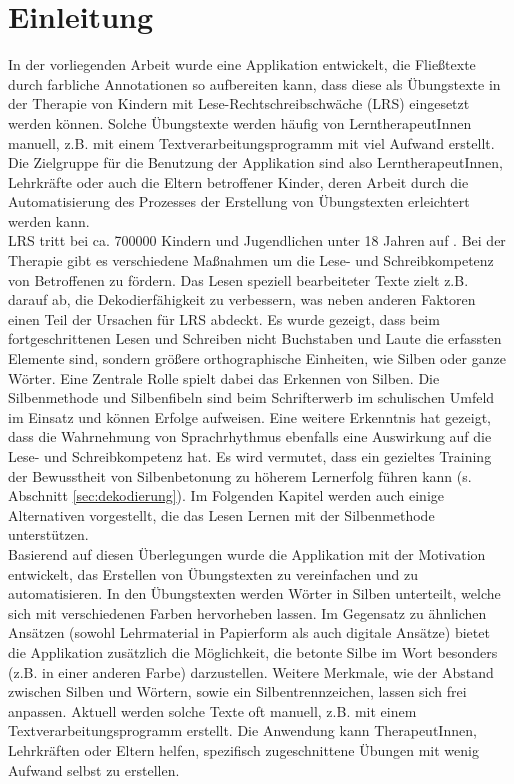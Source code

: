 
\chapter{Einleitung}

In der vorliegenden Arbeit wurde eine Applikation entwickelt, die Fließtexte durch farbliche Annotationen so aufbereiten kann, dass diese als Übungstexte in der Therapie von Kindern mit Lese-Rechtschreibschwäche (LRS) eingesetzt werden können. Solche Übungstexte werden häufig von LerntherapeutInnen manuell, z.B. mit einem Textverarbeitungsprogramm mit viel Aufwand erstellt. Die Zielgruppe für die Benutzung der Applikation sind also LerntherapeutInnen, Lehrkräfte oder auch die Eltern betroffener Kinder, deren Arbeit durch die Automatisierung des Prozesses der Erstellung von Übungstexten erleichtert werden kann.\\

LRS tritt bei ca. 700000 Kindern und Jugendlichen unter 18 Jahren auf \cite{Schulte-Koerne2014} . Bei der Therapie gibt es verschiedene Maßnahmen um die Lese- und Schreibkompetenz von Betroffenen zu fördern. Das Lesen speziell bearbeiteter Texte zielt z.B. darauf ab, die Dekodierfähigkeit zu verbessern, was neben anderen Faktoren einen Teil der Ursachen für LRS abdeckt\cite{Schulte-Koerne2014}. Es wurde gezeigt, dass beim fortgeschrittenen Lesen und Schreiben nicht Buchstaben und Laute die erfassten Elemente sind, sondern größere orthographische Einheiten, wie Silben oder ganze Wörter.\cite{Steinbrink2014} Eine Zentrale Rolle spielt dabei das Erkennen von Silben. Die Silbenmethode und Silbenfibeln sind beim Schrifterwerb im schulischen Umfeld im Einsatz  und können Erfolge aufweisen. Eine weitere Erkenntnis hat gezeigt, dass die Wahrnehmung von Sprachrhythmus ebenfalls eine Auswirkung auf die Lese- und Schreibkompetenz hat\cite{Brandelik2014}. Es wird vermutet, dass ein gezieltes Training der Bewusstheit von Silbenbetonung zu höherem Lernerfolg führen kann\cite{Holz2017} (s. Abschnitt \ref{sec:dekodierung}). Im Folgenden Kapitel werden auch einige Alternativen vorgestellt, die das Lesen Lernen mit der Silbenmethode unterstützen.\\

Basierend auf diesen Überlegungen wurde die Applikation mit der Motivation entwickelt, das Erstellen von Übungstexten zu vereinfachen und zu automatisieren. In den Übungstexten werden Wörter in Silben unterteilt, welche sich mit verschiedenen Farben hervorheben lassen. Im Gegensatz zu ähnlichen Ansätzen (sowohl Lehrmaterial in Papierform als auch digitale Ansätze) bietet die Applikation zusätzlich die Möglichkeit, die betonte Silbe im Wort besonders (z.B. in einer anderen Farbe) darzustellen. Weitere Merkmale, wie der Abstand zwischen Silben und Wörtern, sowie ein Silbentrennzeichen, lassen sich frei anpassen. Aktuell werden solche Texte oft manuell, z.B. mit einem Textverarbeitungsprogramm erstellt. Die Anwendung kann TherapeutInnen, Lehrkräften oder Eltern helfen, spezifisch zugeschnittene Übungen mit wenig Aufwand selbst zu erstellen.\\

